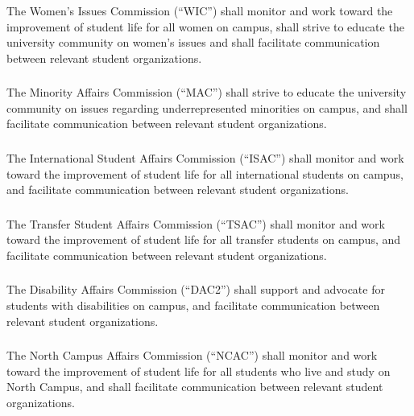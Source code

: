 \subsubsection{}
The Women's Issues Commission (``WIC'') shall monitor and work toward the improvement of student life for all women on campus, shall strive to educate the university community on women's issues and shall facilitate communication between relevant student organizations.

\subsubsection{}
The Minority Affairs Commission (``MAC'') shall strive to educate the university community on issues regarding underrepresented minorities on campus, and shall facilitate communication between relevant student organizations.

\subsubsection{}
The International Student Affairs Commission (``ISAC'') shall monitor and work toward the improvement of student life for all international students on campus, and facilitate communication between relevant student organizations.

\subsubsection{}
The Transfer Student Affairs Commission (``TSAC'') shall monitor and work toward the improvement of student life for all transfer students on campus, and facilitate communication between relevant student organizations.

\subsubsection{}
The Disability Affairs Commission (``DAC2'') shall support and advocate for students with disabilities on campus, and facilitate communication between relevant student organizations.

\subsubsection{}
The North Campus Affairs Commission (``NCAC'') shall monitor and work toward the improvement of student life for all students who live and study on North Campus, and shall facilitate communication between relevant student organizations.

